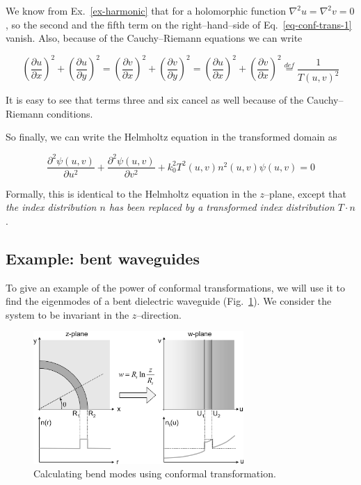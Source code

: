 We know from Ex.~\ref{ex-harmonic} that for a holomorphic function $\nabla^2 u =
\nabla^2 v=0$, so the second and the fifth term on the right--hand--side of
Eq.~\ref{eq-conf-trans-1} vanish. Also, because of the Cauchy--Riemann equations
we can write

\begin{equation}
\left(\frac{\partial u}{\partial x}\right)^2 + \left(\frac{\partial u}{\partial
y}\right)^2 = \left(\frac{\partial v}{\partial x}\right)^2  +
\left(\frac{\partial v}{\partial y}\right)^2 = 
\left(\frac{\partial u}{\partial x}\right)^2 + \left(\frac{\partial v}{\partial
x}\right)^2 
 \stackrel{def}{=} \frac{1}{T(u,v)^2} \label{eq-T-factor}
\end{equation} 

It is easy to see that terms three and six cancel as well because of the
Cauchy--Riemann conditions.

So finally, we can write the Helmholtz equation in the transformed domain as

\begin{equation}
\frac{\partial^2 \psi(u,v)}{\partial u^2} + \frac{\partial^2 \psi(u,v)}{\partial
v^2} + k_0^2 T^2(u,v)n^2(u,v) \psi(u,v) = 0
\end{equation} 

Formally, this is identical to the Helmholtz equation in the $z$--plane, except
that \emph{the index distribution $n$ has been replaced by a transformed index
distribution $T \cdot n$}.

\subsection*{Example: bent waveguides}

To give an example of the power of conformal transformations, we will use it to
find the eigenmodes of a bent dielectric waveguide (Fig.~\ref{fig-bends}). We
consider the system to be invariant in the $z$--direction.

\begin{figure}
\centering
\includegraphics[width=8cm, angle=270]{complex/figures/bends}
\caption{Calculating bend modes using conformal transformation.}
\label{fig-bends}
\end{figure}

